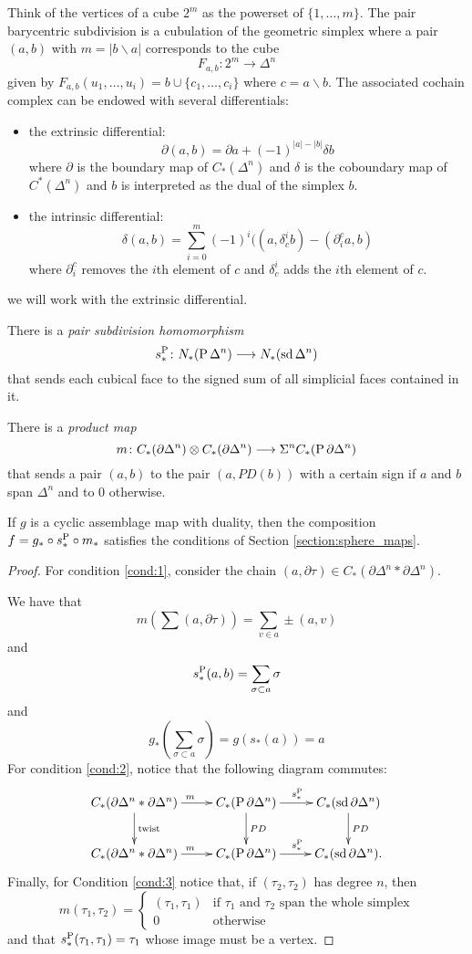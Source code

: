 Think of the vertices of a cube $2^m$ as the powerset of $\{1,\ldots,m\}$. The pair barycentric subdivision is a cubulation of the geometric simplex where a pair $(a,b)$ with $m=|b\smallsetminus a|$ corresponds to the cube
\[F_{a,b}\colon 2^{m}\to \Delta^n\]
given by $F_{a,b}(u_1,\ldots,u_i) = b\cup \{c_1,\ldots,c_i\}$ where $c=a\smallsetminus b$. The associated cochain complex can be endowed with several differentials:
\begin{itemize}
\item the extrinsic differential:
\[\partial(a,b) = \partial a + (-1)^{|a|-|b|} \delta b\]
where $\partial$ is the boundary map of $C_*(\Delta^n)$ and $\delta$ is the coboundary map of $C^*(\Delta^n)$ and $b$ is interpreted as the dual of the simplex $b$.
\item the intrinsic differential:
\[\delta(a,b) = \sum_{i=0}^m (-1)^i((a,\delta^i_c b)-(\partial^c_i a,b)\]
where $\partial_i^c$ removes the $i$th element of $c$ and $\delta^i_c$ adds the $i$th element of $c$.
\end{itemize}
we will work with the extrinsic differential.

There is a \emph{pair subdivision homomorphism}
\[s_*^{\operatorname{P}}\colon N_*(\operatorname{P} \Delta^n)\longrightarrow N_*(\operatorname{sd} \Delta^n)\]
that sends each cubical face to the signed sum of all simplicial faces contained in it. 

There is a \emph{product map}
\[m\colon C_*(\partial \Delta^n)\otimes C_*(\partial \Delta^n)\longrightarrow \Sigma^n C_*(\operatorname{P} \partial \Delta^n) \]
that sends a pair $(a,b)$ to the pair $(a,PD(b))$ with a certain sign if $a$ and $b$ span $\Delta^n$ and to $0$ otherwise.

\begin{proposition}
    If $g$ is a cyclic assemblage map with duality, then the composition $f = g_*\circ s_*^{\operatorname{P}}\circ m_*$ satisfies the conditions of Section \ref{section:sphere_maps}.
\end{proposition}
\begin{proof}
For condition \ref{cond:1}, consider the chain $(a,\partial \tau)\in C_*(\partial \Delta^n*\partial \Delta^n)$. 

We have that 
\[
m\left(\sum (a,\partial \tau)\right) = \sum_{v\in a} \pm(a,v)
\]
and
\[
s^{\operatorname{P}}_*(a,b) = \sum_{\sigma\subset a} \sigma 
\]
and
\[g_*\left(\sum_{\sigma\subset a} \sigma\right) = g(s_*(a)) = a
\]
For condition \ref{cond:2}, notice that the following diagram commutes:
\[\xymatrix{
C_*(\partial \Delta^n*\partial\Delta^n)\ar[r]^m\ar[d]^{\text{twist}} &C_*(\Psd \partial \Delta^n) \ar[r]^{s_*^{\Psd}}\ar[d]^{PD}& C_*(\sd \partial \Delta^n)\ar[d]^{PD}\\
C_*(\partial \Delta^n*\partial\Delta^n)\ar[r]^m &C_*(\Psd \partial \Delta^n) \ar[r]^{s_*^{\Psd}}& C_*(\sd \partial \Delta^n).
}\]
Finally, for Condition \ref{cond:3} notice that, if $(\tau_2,\tau_2)$ has degree $n$, then
\[m(\tau_1,\tau_2) = 
\begin{cases}
(\tau_1,\tau_1) & \text{if $\tau_1$ and $\tau_2$ span the whole simplex} \\
0 & \text{otherwise}
\end{cases}
\]
and that $s^{\operatorname{P}}_*(\tau_1,\tau_1) = \tau_1$ whose image must be a vertex.
\end{proof}

